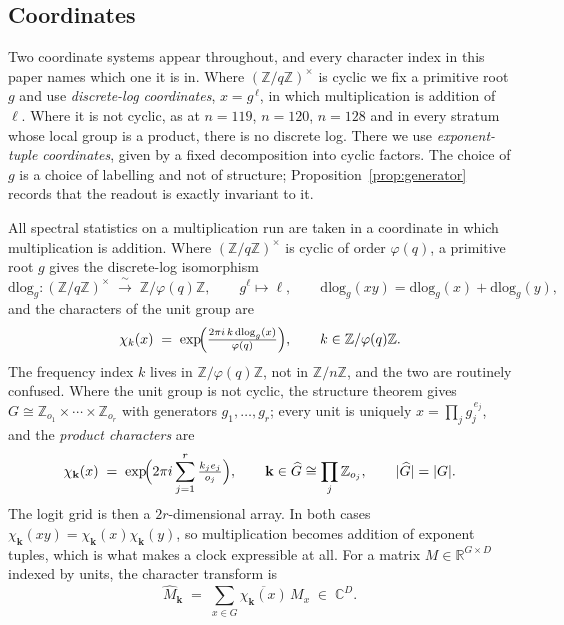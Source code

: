 \subsection{Coordinates}
\label{sec:methods-coords}
\label{sec:setup-coords}

Two coordinate systems appear throughout, and every character index in this paper names which
one it is in. Where $(\mathbb{Z}/q\mathbb{Z})^{\times}$ is cyclic we fix a primitive root $g$
and use \emph{discrete-log coordinates}, $x = g^{\,\ell}$, in which multiplication is addition
of $\ell$. Where it is not cyclic, as at $n = 119$, $n = 120$, $n = 128$ and in every stratum
whose local group is a product, there is no discrete log. There we use \emph{exponent-tuple
coordinates}, given by a fixed decomposition into cyclic factors. The choice of $g$ is a choice
of labelling and not of structure; Proposition~\ref{prop:generator} records that
the readout is exactly invariant to it.

All spectral statistics on a multiplication run are taken in a coordinate in which
multiplication is addition. Where $(\mathbb{Z}/q\mathbb{Z})^{\times}$ is cyclic of order
$\varphi(q)$, a primitive root $g$ gives the discrete-log isomorphism
\begin{equation}
  \label{eq:dlog}
  \mathrm{dlog}_{g} : (\mathbb{Z}/q\mathbb{Z})^{\times} \;\xrightarrow{\ \sim\ }\;
  \mathbb{Z}/\varphi(q)\mathbb{Z},
  \qquad g^{\ell} \longmapsto \ell,
  \qquad \mathrm{dlog}_{g}(xy) = \mathrm{dlog}_{g}(x) + \mathrm{dlog}_{g}(y) ,
\end{equation}
and the characters of the unit group are
\begin{equation}
  \label{eq:character}
  \chi_{k}(x) \;=\; \exp\!\Bigl( \tfrac{2\pi i\, k\, \mathrm{dlog}_{g}(x)}{\varphi(q)} \Bigr),
  \qquad k \in \mathbb{Z}/\varphi(q)\mathbb{Z} .
\end{equation}
The frequency index $k$ lives in $\mathbb{Z}/\varphi(q)\mathbb{Z}$, not in
$\mathbb{Z}/n\mathbb{Z}$, and the two are routinely confused. Where the unit group is not
cyclic, the structure theorem gives $G \cong \mathbb{Z}_{o_{1}} \times \cdots \times
\mathbb{Z}_{o_{r}}$ with generators $g_{1}, \dots, g_{r}$; every unit is uniquely
$x = \prod_{j} g_{j}^{\,e_{j}}$, and the \emph{product characters} are
\begin{equation}
  \label{eq:prodchar}
  \chi_{\mathbf{k}}(x) \;=\;
  \exp\!\Bigl( 2\pi i \sum_{j=1}^{r} \tfrac{k_{j} e_{j}}{o_{j}} \Bigr),
  \qquad \mathbf{k} \in \widehat{G} \cong \prod_{j} \mathbb{Z}_{o_{j}},
  \qquad |\widehat{G}| = |G| .
\end{equation}
The logit grid is then a $2r$-dimensional array. In both cases $\chi_{\mathbf{k}}(xy) =
\chi_{\mathbf{k}}(x)\chi_{\mathbf{k}}(y)$, so multiplication becomes addition of exponent
tuples, which is what makes a clock expressible at all. For a matrix $M \in
\mathbb{R}^{G \times D}$ indexed by units, the character transform is
\begin{equation}
  \label{eq:transform}
  \widehat{M}_{\mathbf{k}} \;=\; \sum_{x \in G} \overline{\chi_{\mathbf{k}}(x)}\, M_{x}
  \;\in\; \mathbb{C}^{D} .
\end{equation}

